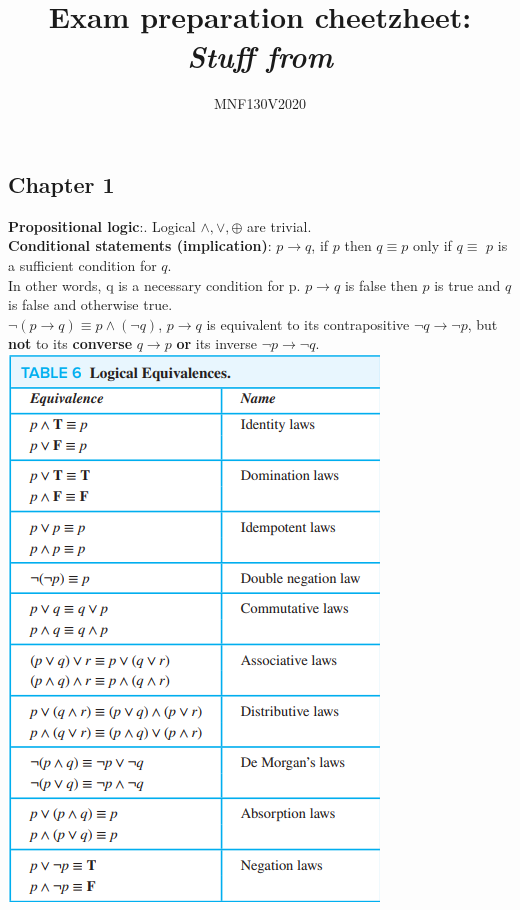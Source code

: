 \documentclass[12pt]{article}
\title{\huge Exam preparation cheetzheet: \\ \textit{Stuff from}}
\author{\LARGE MNF130V2020}
\begin{document}
\maketitle

\bigskip

\newpage

\subsection{Chapter 1}
\smallskip
\textbf{Propositional logic}:. Logical $\wedge,\vee,\oplus$ are trivial. \\
\smallskip
\textbf{Conditional statements (implication)}: $p \rightarrow q$, if $p$ then $q \equiv p $ only if $q \equiv$ $p$ is a sufficient condition for $q$. \\
In other words, q is a necessary condition for p. $p \rightarrow q$ is false then $p$ is true and $q$ is false and otherwise true. \\
$\neg(p\rightarrow q)\equiv p \wedge (\neg q)$, $p \rightarrow q$ is equivalent to its contrapositive $\neg q \rightarrow \neg p$, but \textbf{not} to its \textbf{converse} $q \rightarrow p$ \textbf{or} its inverse $\neg p \rightarrow \neg q$. \\
\includegraphics[scale=0.8]{logical_equivalences} \\
\end{document}
